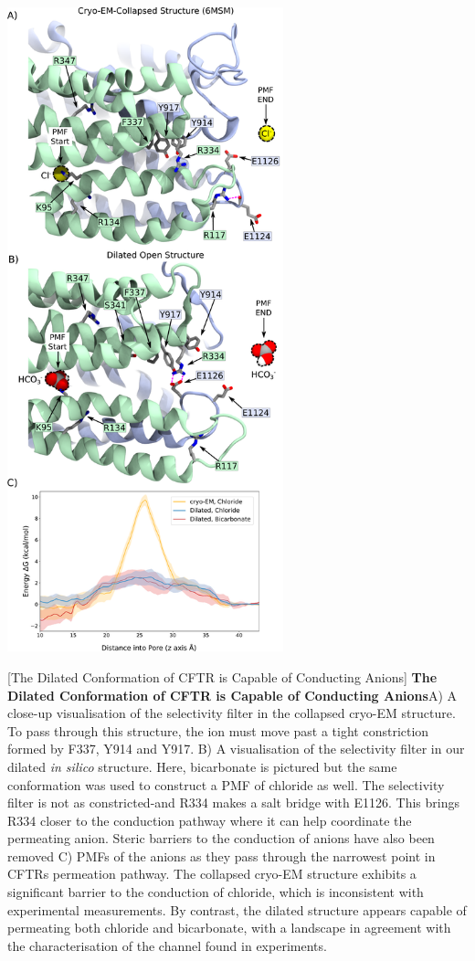 	\begin{center}
		\includegraphics[width=0.6\textwidth]{figures/opening/pmf_fig_1_combined.pdf}
	\end{center}
\begingroup

	\captionsetup{singlelinecheck = false, justification=raggedright}
	[The Dilated Conformation of CFTR is Capable of Conducting Anions] {\textbf{The Dilated Conformation of CFTR is Capable of Conducting Anions}}{A) A close-up visualisation of the selectivity filter in the collapsed cryo-EM structure. To pass through this structure, the ion must move past a tight constriction formed by F337, Y914 and Y917. B) A visualisation of the selectivity filter in our dilated \textit{in silico} structure. Here, bicarbonate is pictured but the same conformation was used to construct a PMF of chloride as well. The selectivity filter is not as constricted-and R334 makes a salt bridge with E1126. This brings R334 closer to the conduction pathway where it can help coordinate the permeating anion. Steric barriers to the conduction of anions have also been removed C) PMFs of the anions as they pass through the narrowest point in CFTRs permeation pathway. The collapsed cryo-EM structure exhibits a significant barrier to the conduction of chloride, which is inconsistent with experimental measurements. By contrast, the dilated structure appears capable of permeating both chloride and bicarbonate, with a landscape in agreement with the characterisation of the channel found in experiments. }
	\label{US_anions}
	\endgroup



